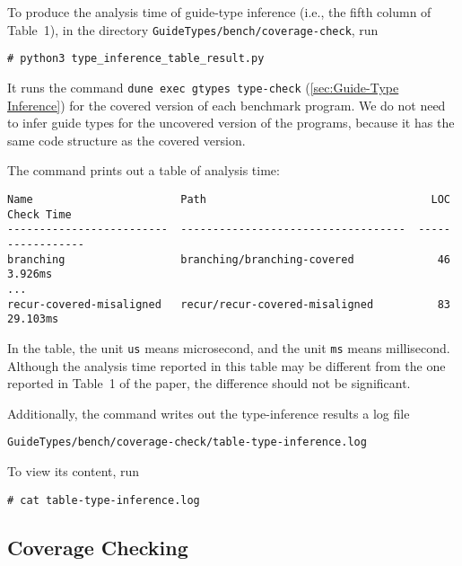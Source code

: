 To produce the analysis time of guide-type inference (i.e., the fifth column of
Table~1), in the directory \texttt{GuideTypes/bench/coverage-check}, run
\begin{verbatim}
# python3 type_inference_table_result.py
\end{verbatim}
%
It runs the command \texttt{dune exec gtypes type-check} (\cref{sec:Guide-Type
  Inference}) for the covered version of each benchmark program.
%
We do not need to infer guide types for the uncovered version of the programs,
because it has the same code structure as the covered version.

The command prints out a table of analysis time:
\begin{verbatim}
Name                       Path                                   LOC  Check Time
-------------------------  -----------------------------------  -----  ------------
branching                  branching/branching-covered             46  3.926ms
...
recur-covered-misaligned   recur/recur-covered-misaligned          83  29.103ms
\end{verbatim}
%
In the table, the unit \texttt{us} means microsecond, and the unit \texttt{ms}
means millisecond.
%
Although the analysis time reported in this table may be different from the one
reported in Table~1 of the paper, the difference should not be significant.

Additionally, the command writes out the type-inference results a log file
\begin{verbatim}
GuideTypes/bench/coverage-check/table-type-inference.log
\end{verbatim}
%
To view its content, run
\begin{verbatim}
# cat table-type-inference.log
\end{verbatim}

\subsection{Coverage Checking}

